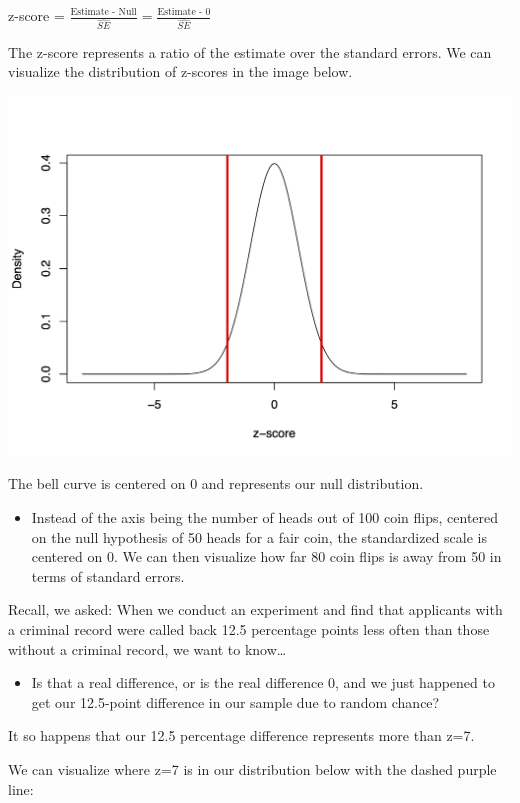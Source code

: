 \documentclass[
  letterpaper,
  DIV=11,
  numbers=noendperiod]{scrreprt}
\providecommand{\tightlist}{%
  \setlength{\itemsep}{0pt}\setlength{\parskip}{0pt}}\usepackage{longtable,booktabs,array}
\begin{document}
z-score =
\(\frac{\text{Estimate - Null}}{\hat{SE}} = \frac{\text{Estimate - 0}}{\hat{SE}}\)

The z-score represents a ratio of the estimate over the standard errors.
We can visualize the distribution of z-scores in the image below.

\includegraphics{images/zscore.png}

The bell curve is centered on 0 and represents our null distribution.

\begin{itemize}
\tightlist
\item
  Instead of the axis being the number of heads out of 100 coin flips,
  centered on the null hypothesis of 50 heads for a fair coin, the
  standardized scale is centered on 0. We can then visualize how far 80
  coin flips is away from 50 in terms of standard errors.
\end{itemize}

Recall, we asked: When we conduct an experiment and find that applicants
with a criminal record were called back 12.5 percentage points less
often than those without a criminal record, we want to know\ldots{}

\begin{itemize}
\tightlist
\item
  Is that a real difference, or is the real difference 0, and we just
  happened to get our 12.5-point difference in our sample due to random
  chance?
\end{itemize}

It so happens that our 12.5 percentage difference represents more than
z=7.

We can visualize where z=7 is in our distribution below with the dashed
purple line:
\end{document}
